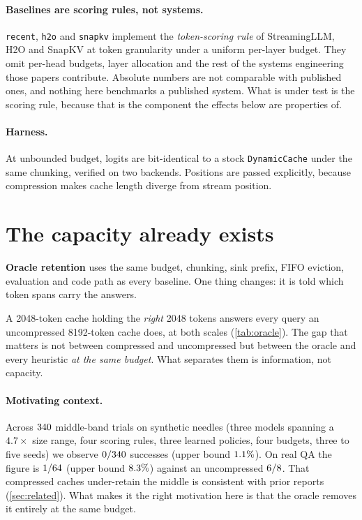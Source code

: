 \documentclass[10pt]{article}
\begin{document}
\paragraph{Baselines are scoring rules, not systems.}
\texttt{recent}, \texttt{h2o} and \texttt{snapkv} implement the
\emph{token-scoring rule} of StreamingLLM, H2O and SnapKV at token granularity
under a uniform per-layer budget. They omit per-head budgets, layer allocation
and the rest of the systems engineering those papers contribute. Absolute
numbers are not comparable with published ones, and nothing here benchmarks a
published system. What is under test is the scoring rule, because that is the
component the effects below are properties of.

\paragraph{Harness.} At unbounded budget, logits are bit-identical to a stock
\texttt{DynamicCache} under the same chunking, verified on two backends.
Positions are passed explicitly, because compression makes cache length
diverge from stream position.

\section{The capacity already exists}\label{sec:oracle}

\textbf{Oracle retention} uses the same budget, chunking, sink prefix, FIFO
eviction, evaluation and code path as every baseline. One thing changes: it is
told which token spans carry the answers.

\begin{table}[ht]\centering\small
\caption{Oracle retention against the best heuristics on identical needle
streams ($B{=}2048$, $L{=}8192$, five seeds). Band cells are queries answered
out of those in the band; intervals are Wilson 95\%. Only the information given
to the policy differs between rows.}
\label{tab:oracle}
\TabOracle
\end{table}

A 2048-token cache holding the \emph{right} 2048 tokens answers every query an
uncompressed 8192-token cache does, at both scales
(\cref{tab:oracle}). The gap that matters is not between compressed and
uncompressed but between the oracle and every heuristic \emph{at the same
budget}. What separates them is information, not capacity.

\paragraph{Motivating context.} Across $340$ middle-band trials on synthetic
needles (three models spanning a $4.7\times$ size range, four scoring rules,
three learned policies, four budgets, three to five seeds) we observe
$0/340$ successes (upper bound $1.1\%$). On real QA the figure is
$1/64$ (upper bound $8.3\%$) against an uncompressed $6/8$.
That compressed caches under-retain the middle is
consistent with prior reports (\cref{sec:related}). What makes it the right
motivation here is that the oracle removes it entirely at the same budget.
\end{document}
